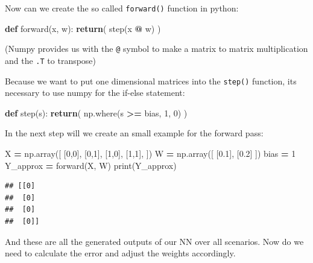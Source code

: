 \documentclass[
]{book}
\newenvironment{Shaded}{\begin{snugshade}}{\end{snugshade}}
\newcommand{\BuiltInTok}[1]{#1}
\newcommand{\ControlFlowTok}[1]{\textcolor[rgb]{0.13,0.29,0.53}{\textbf{#1}}}
\newcommand{\DecValTok}[1]{\textcolor[rgb]{0.00,0.00,0.81}{#1}}
\newcommand{\FloatTok}[1]{\textcolor[rgb]{0.00,0.00,0.81}{#1}}
\newcommand{\KeywordTok}[1]{\textcolor[rgb]{0.13,0.29,0.53}{\textbf{#1}}}
\newcommand{\NormalTok}[1]{#1}
\newcommand{\OperatorTok}[1]{\textcolor[rgb]{0.81,0.36,0.00}{\textbf{#1}}}
\begin{document}
Now can we create the so called \texttt{forward()} function in python:

\begin{Shaded}
\begin{Highlighting}[]
\KeywordTok{def}\NormalTok{ forward(x, w):}
  \ControlFlowTok{return}\NormalTok{( step(x }\OperatorTok{@}\NormalTok{ w) )}
\end{Highlighting}
\end{Shaded}

(Numpy provides us with the \texttt{@} symbol to make a matrix to matrix multiplication and the \texttt{.T} to transpose)

Because we want to put one dimensional matrices into the \texttt{step()} function, its necessary to use numpy for the if-else statement:

\begin{Shaded}
\begin{Highlighting}[]
\KeywordTok{def}\NormalTok{ step(s):}
  \ControlFlowTok{return}\NormalTok{( np.where(s }\OperatorTok{\textgreater{}=}\NormalTok{ bias, }\DecValTok{1}\NormalTok{, }\DecValTok{0}\NormalTok{) )}
\end{Highlighting}
\end{Shaded}

In the next step will we create an small example for the forward pass:

\begin{Shaded}
\begin{Highlighting}[]
\NormalTok{X }\OperatorTok{=}\NormalTok{ np.array([}
\NormalTok{  [}\DecValTok{0}\NormalTok{,}\DecValTok{0}\NormalTok{],}
\NormalTok{  [}\DecValTok{0}\NormalTok{,}\DecValTok{1}\NormalTok{],}
\NormalTok{  [}\DecValTok{1}\NormalTok{,}\DecValTok{0}\NormalTok{],}
\NormalTok{  [}\DecValTok{1}\NormalTok{,}\DecValTok{1}\NormalTok{],}
\NormalTok{])}
\NormalTok{W }\OperatorTok{=}\NormalTok{ np.array([}
\NormalTok{  [}\FloatTok{0.1}\NormalTok{], }
\NormalTok{  [}\FloatTok{0.2}\NormalTok{]}
\NormalTok{])}
\NormalTok{bias }\OperatorTok{=} \DecValTok{1}
\NormalTok{Y\_approx }\OperatorTok{=}\NormalTok{ forward(X, W)}
\BuiltInTok{print}\NormalTok{(Y\_approx)}
\end{Highlighting}
\end{Shaded}

\begin{verbatim}
## [[0]
##  [0]
##  [0]
##  [0]]
\end{verbatim}

And these are all the generated outputs of our NN over all scenarios. Now do we need to calculate the error and adjust the weights accordingly.
\end{document}
